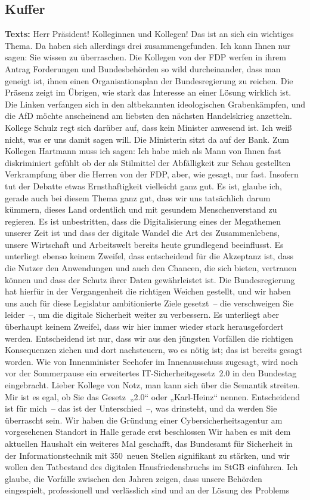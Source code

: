 \documentclass{article}
\begin{document}
\subsection{Kuffer}
\noindent\textbf{Texts:} Herr Präsident! Kolleginnen und Kollegen! Das ist an sich ein wichtiges Thema. Da haben sich allerdings drei zusammengefunden. Ich kann Ihnen nur sagen: Sie wissen zu überraschen. Die Kollegen von der FDP werfen in ihrem Antrag Forderungen und Bundesbehörden so wild durcheinander, dass man geneigt ist, ihnen einen Organisationsplan der Bundesregierung zu reichen.  Die Präsenz zeigt im Übrigen, wie stark das Interesse an einer Lösung wirklich ist.  Die Linken verfangen sich in den altbekannten ideologischen Grabenkämpfen, und die AfD möchte anscheinend am liebsten den nächsten Handelskrieg anzetteln.  Kollege Schulz regt sich darüber auf, dass kein Minister anwesend ist. Ich weiß nicht, was er uns damit sagen will. Die Ministerin sitzt da auf der Bank.  Zum Kollegen Hartmann muss ich sagen: Ich habe mich als Mann von Ihnen fast diskriminiert gefühlt ob der als Stilmittel der Abfälligkeit zur Schau gestellten Verkrampfung über die Herren von der FDP, aber, wie gesagt, nur fast. Insofern tut der Debatte etwas Ernsthaftigkeit vielleicht ganz gut.  Es ist, glaube ich, gerade auch bei diesem Thema ganz gut, dass wir uns tatsächlich darum kümmern, dieses Land ordentlich und mit gesundem Menschenverstand zu regieren. Es ist unbestritten, dass die Digitalisierung eines der Megathemen unserer Zeit ist und dass der digitale Wandel die Art des Zusammenlebens, unsere Wirtschaft und Arbeitswelt bereits heute grundlegend beeinflusst. Es unterliegt ebenso keinem Zweifel, dass entscheidend für die Akzeptanz ist, dass die Nutzer den Anwendungen und auch den Chancen, die sich bieten, vertrauen können und dass der Schutz ihrer Daten gewährleistet ist. Die Bundesregierung hat hierfür in der Vergangenheit die richtigen Weichen gestellt, und wir haben uns auch für diese Legislatur ambitionierte Ziele gesetzt – die verschweigen Sie leider –, um die digitale Sicherheit weiter zu verbessern.  Es unterliegt aber überhaupt keinem Zweifel, dass wir hier immer wieder stark herausgefordert werden. Entscheidend ist nur, dass wir aus den jüngsten Vorfällen die richtigen Konsequenzen ziehen und dort nachsteuern, wo es nötig ist; das ist bereits gesagt worden. Wie von Innenminister Seehofer im Innenausschuss zugesagt, wird noch vor der Sommerpause ein erweitertes IT-Sicherheitsgesetz 2.0 in den Bundestag eingebracht. Lieber Kollege von Notz, man kann sich über die Semantik streiten. Mir ist es egal, ob Sie das Gesetz „2.0“  oder „Karl-Heinz“ nennen. Entscheidend ist für mich – das ist der Unterschied –, was drinsteht, und da werden Sie überrascht sein.  Wir haben die Gründung einer Cybersicherheitsagentur am vorgesehenen Standort in Halle gerade erst beschlossen Wir haben es mit dem aktuellen Haushalt ein weiteres Mal geschafft, das Bundesamt für Sicherheit in der Informationstechnik mit 350 neuen Stellen signifikant zu stärken, und wir wollen den Tatbestand des digitalen Hausfriedensbruchs im StGB einführen.  Ich glaube, die Vorfälle zwischen den Jahren zeigen, dass unsere Behörden eingespielt, professionell und verlässlich sind und an der Lösung des Problems 
\end{document}
